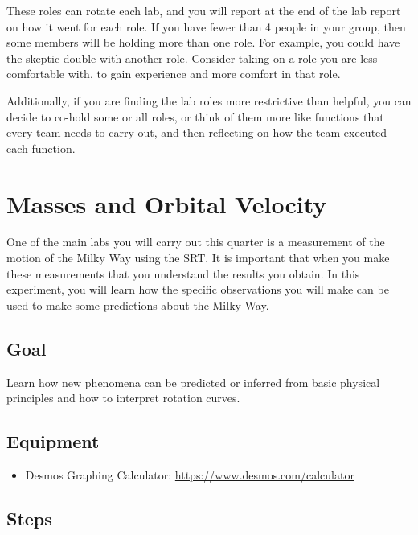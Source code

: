 These roles can rotate each lab, and you will report at the end of the lab report on how it went for each role. If you have fewer than 4 people in your group, then some members will be holding more than one role. For example, you could have the skeptic double with another role. Consider taking on a role you are less comfortable with, to gain experience and more comfort in that role.

Additionally, if you are finding the lab roles more restrictive than helpful, you can decide to co-hold some or all roles, or think of them more like functions that every team needs to carry out, and then reflecting on how the team executed each function.

\section{Masses and Orbital Velocity} %
One of the main labs you will carry out this quarter is a measurement of the motion of the Milky Way using the SRT. It is important that when you make these measurements that you understand the results you obtain. In this experiment, you will learn how the specific observations you will make can be used to make some predictions about the Milky Way. 

\subsection{Goal}
Learn how new phenomena can be predicted or inferred from basic physical principles and how to interpret rotation curves. 

\subsection{Equipment}

\begin{itemize}
	\item Desmos Graphing Calculator: \url{https://www.desmos.com/calculator}
\end{itemize}

\subsection{Steps}

